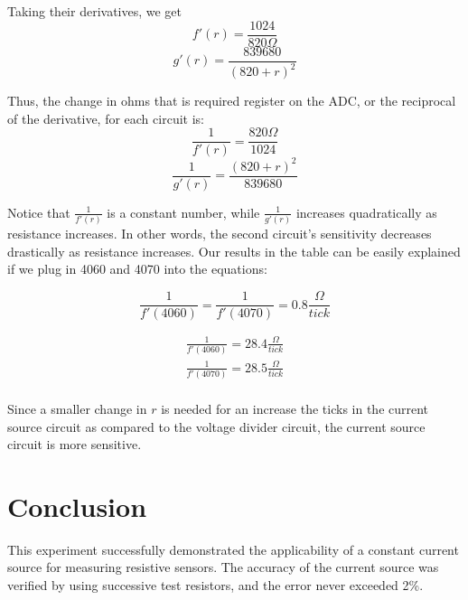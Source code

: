 \documentclass[12pt]{article}
\begin{document}
Taking their derivatives, we get 
\begin{equation}
    f'(r) = \frac{1024}{820\Omega}
\end{equation}
\begin{equation}
    g'(r) = \frac{839680}{(820 + r)^2}
\end{equation}

Thus, the change in ohms that is required register on the ADC, or the reciprocal of the derivative, for each circuit is:
\begin{equation}
    \frac{1}{f'(r)} = \frac{820\Omega}{1024}
\end{equation}
\begin{equation}
    \frac{1}{g'(r)} = \frac{(820 + r)^2}{839680}
\end{equation}

Notice that $\frac{1}{f'(r)}$ is a constant number, while $\frac{1}{g'(r)}$ increases quadratically as resistance increases. In other words, the second circuit's sensitivity decreases drastically as resistance increases. Our results in the table can be easily explained if we plug in 4060 and 4070 into the equations:

\begin{equation}
    \frac{1}{f'(4060)} = \frac{1}{f'(4070)} = 0.8 \frac{\Omega}{tick}
\end{equation}

\begin{equation}
    \begin{aligned}
        \frac{1}{f'(4060)} = 28.4\frac{\Omega}{tick} \\
        \frac{1}{f'(4070)} = 28.5\frac{\Omega}{tick} \\
    \end{aligned}
\end{equation}

Since a smaller change in $r$ is needed for an increase the ticks in the current source circuit as compared to the voltage divider circuit, the current source circuit is more sensitive.

\section*{Conclusion}

This experiment successfully demonstrated the applicability of a constant current source for measuring resistive sensors. The accuracy of the current source was verified by using successive test resistors, and the error never exceeded 2\%.
\end{document}
